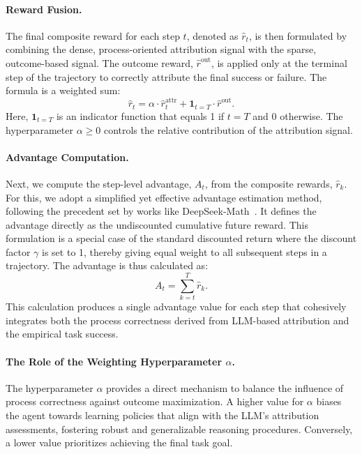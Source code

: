 \paragraph{Reward Fusion.}
The final composite reward for each step $t$, denoted as $\hat{r}_t$, is then formulated by combining the dense, process-oriented attribution signal with the sparse, outcome-based signal. The outcome reward, $\hat{r}^{\text{out}}$, is applied only at the terminal step of the trajectory to correctly attribute the final success or failure. The formula is a weighted sum:
\begin{equation}
    \hat{r}_t = \alpha \cdot \hat{r}^{\text{attr}}_t + \mathbf{1}_{t=T} \cdot \hat{r}^{\text{out}}.
\end{equation}
Here, $\mathbf{1}_{t=T}$ is an indicator function that equals 1 if $t=T$ and 0 otherwise. The hyperparameter $\alpha \ge 0$ controls the relative contribution of the attribution signal.

\paragraph{Advantage Computation.}
Next, we compute the step-level advantage, $A_t$, from the composite rewards, $\hat{r}_k$. For this, we adopt a simplified yet effective advantage estimation method, following the precedent set by works like DeepSeek-Math~\citep{deepseek_math}. It defines the advantage directly as the undiscounted cumulative future reward. This formulation is a special case of the standard discounted return where the discount factor $\gamma$ is set to 1, thereby giving equal weight to all subsequent steps in a trajectory. The advantage is thus calculated as:
\begin{equation}
    A_t = \sum_{k=t}^{T} \hat{r}_k.
\end{equation}
This calculation produces a single advantage value for each step that cohesively integrates both the process correctness derived from LLM-based attribution and the empirical task success.



\paragraph{The Role of the Weighting Hyperparameter $\alpha$.}
The hyperparameter $\alpha$ provides a direct mechanism to balance the influence of process correctness against outcome maximization. A higher value for $\alpha$ biases the agent towards learning policies that align with the LLM's attribution assessments, fostering robust and generalizable reasoning procedures. Conversely, a lower value prioritizes achieving the final task goal.

